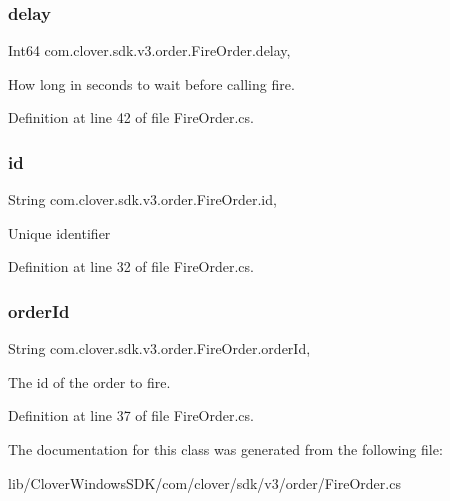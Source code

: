 \subsubsection{\texorpdfstring{delay}{delay}}
{\footnotesize\ttfamily Int64 com.\+clover.\+sdk.\+v3.\+order.\+Fire\+Order.\+delay\hspace{0.3cm}{\ttfamily [get]}, {\ttfamily [set]}}



How long in seconds to wait before calling fire. 



Definition at line 42 of file Fire\+Order.\+cs.

\mbox{\label{classcom_1_1clover_1_1sdk_1_1v3_1_1order_1_1_fire_order_a67ccc9bed5206192b4da536dfbc4595f}} 
\subsubsection{\texorpdfstring{id}{id}}
{\footnotesize\ttfamily String com.\+clover.\+sdk.\+v3.\+order.\+Fire\+Order.\+id\hspace{0.3cm}{\ttfamily [get]}, {\ttfamily [set]}}



Unique identifier 



Definition at line 32 of file Fire\+Order.\+cs.

\mbox{\label{classcom_1_1clover_1_1sdk_1_1v3_1_1order_1_1_fire_order_a99284e04888e31790949f4ede72eb805}} 
\subsubsection{\texorpdfstring{order\+Id}{orderId}}
{\footnotesize\ttfamily String com.\+clover.\+sdk.\+v3.\+order.\+Fire\+Order.\+order\+Id\hspace{0.3cm}{\ttfamily [get]}, {\ttfamily [set]}}



The id of the order to fire. 



Definition at line 37 of file Fire\+Order.\+cs.



The documentation for this class was generated from the following file\+:\begin{DoxyCompactItemize}
\item 
lib/\+Clover\+Windows\+S\+D\+K/com/clover/sdk/v3/order/Fire\+Order.\+cs\end{DoxyCompactItemize}
